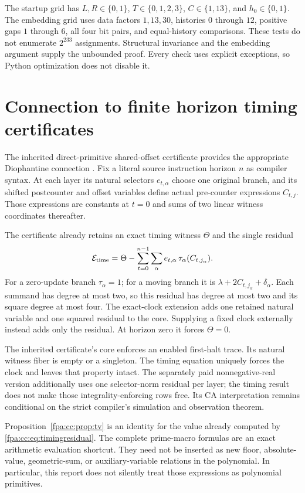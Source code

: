 \documentclass[11pt,a4paper]{article}
\numberwithin{equation}{section}
\newcommand{\lam}{\lambda}
\begin{document}
The startup grid has $L,R\in\{0,1\}$, $T\in\{0,1,2,3\}$,
$C\in\{1,13\}$, and $h_0\in\{0,1\}$. The embedding grid uses data factors
$1,13,30$, histories $0$ through $12$, positive gaps $1$ through $6$, all
four bit pairs, and equal-history comparisons. These tests do not enumerate
$2^{233}$ assignments. Structural invariance and the embedding argument
supply the unbounded proof. Every check uses explicit exceptions, so
Python optimization does not disable it.
\newpage

\section{Connection to finite horizon timing certificates}
\label{fpa:cc:sec:diophantine}
The inherited direct-primitive shared-offset certificate provides the
appropriate Diophantine connection \cite{fpa:shared}. Fix a literal source
instruction horizon $n$ as compiler syntax. At each layer its natural
selectors $e_{t,\alpha}$ choose one original branch, and its shifted
postcounter and offset variables define actual pre-counter expressions
$C_{t,j}$. Those expressions are constants at $t=0$ and sums of two
linear witness coordinates thereafter.

The certificate already retains an exact timing witness $\Theta$ and the
single residual
\begin{equation}
 \mathcal E_{\rm time}
 =\Theta-\sum_{t=0}^{n-1}\sum_{\alpha}
       e_{t,\alpha}\,\tau_\alpha(C_{t,j_\alpha}).
 \label{fpa:cc:eq:timingresidual}
\end{equation}
For a zero-update branch $\tau_\alpha=1$; for a moving branch it is
$\lam+2C_{t,j_\alpha}+\delta_\alpha$. Each summand has degree at most two,
so this residual has degree at most two and its square degree at most
four. The exact-clock extension adds one retained natural variable and
one squared residual to the core. Supplying a fixed clock externally
instead adds only the residual. At horizon zero it forces $\Theta=0$.

The inherited certificate's core enforces an enabled first-halt trace.
Its natural witness fiber is empty or a singleton. The timing equation
uniquely forces the clock and leaves that property intact. The separately
paid nonnegative-real version additionally uses one selector-norm residual
per layer; the timing result does not make those integrality-enforcing
rows free. Its CA interpretation remains conditional on the strict
compiler's simulation and observation theorem.

Proposition~\ref{fpa:cc:prop:tv} is an identity for the value already computed by
\eqref{fpa:cc:eq:timingresidual}. The complete prime-macro formulas are an exact
arithmetic evaluation shortcut. They need not be inserted as new floor,
absolute-value, geometric-sum, or auxiliary-variable relations in the
polynomial. In particular, this report does not silently treat those
expressions as polynomial primitives.
\end{document}
